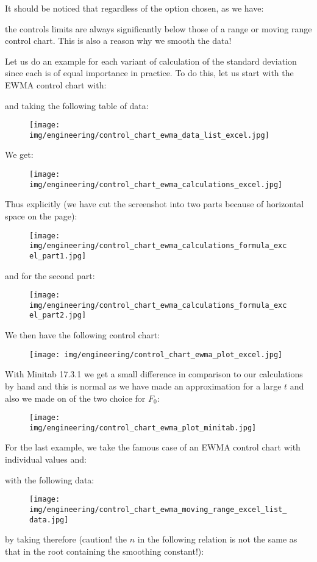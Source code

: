 	It should be noticed that regardless of the option chosen, as we have:
	
	the controls limits are always significantly below those of a range or moving range control chart. This is also a reason why we smooth the data!

	Let us do an example for each variant of calculation of the standard deviation since each is of equal importance in practice. To do this, let us start with the EWMA control chart with:
	
	and taking the following table of data:
	\begin{figure}[H]
		\centering
		\texttt{[image: img/engineering/control\_chart\_ewma\_data\_list\_excel.jpg]}
	\end{figure}
	We get:
	\begin{figure}[H]
		\centering
		\texttt{[image: img/engineering/control\_chart\_ewma\_calculations\_excel.jpg]}
	\end{figure}
	Thus explicitly (we have cut the screenshot into two parts because of horizontal space on the page):
	\begin{figure}[H]
		\centering
		\texttt{[image: img/engineering/control\_chart\_ewma\_calculations\_formula\_excel\_part1.jpg]}
	\end{figure}
	and for the second part:
	\begin{figure}[H]
		\centering
		\texttt{[image: img/engineering/control\_chart\_ewma\_calculations\_formula\_excel\_part2.jpg]}
	\end{figure}
	We then have the following control chart:
	\begin{figure}[H]
		\centering
		\texttt{[image: img/engineering/control\_chart\_ewma\_plot\_excel.jpg]}
	\end{figure}
	With Minitab 17.3.1 we get a small difference in comparison to our calculations by hand and this is normal as we have made an approximation for a large $t$ and also we made on of the two choice for $F_0$:
	\begin{figure}[H]
		\centering
		\texttt{[image: img/engineering/control\_chart\_ewma\_plot\_minitab.jpg]}
	\end{figure}
	For the last example, we take the famous case of an EWMA control chart with individual values and:
	
	with the following data:
	\begin{figure}[H]
		\centering
		\texttt{[image: img/engineering/control\_chart\_ewma\_moving\_range\_excel\_list\_data.jpg]}
	\end{figure}
	by taking therefore (caution! the $n$ in the following relation is not the same as that in the root containing the smoothing constant!):
	
